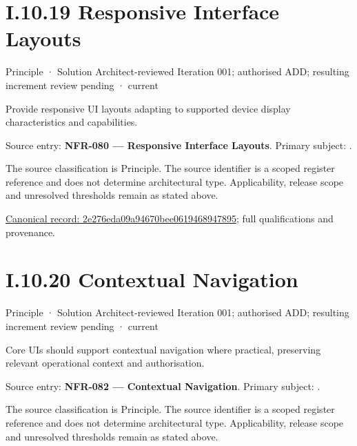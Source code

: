 \section*{I.10.19 Responsive Interface Layouts}
\label{navigation:I.10.19}

\label{element:2e276eda09a94670bee0619468947895}
{\small Principle · Solution Architect-reviewed Iteration 001; authorised ADD; resulting increment review pending · current}\par

Provide responsive UI layouts adapting to supported device display characteristics and capabilities.



Source entry: \textbf{NFR-080 — Responsive Interface Layouts}. Primary subject: \texttt{}.



The source classification is Principle. The source identifier is a scoped register reference and does not determine architectural type. Applicability, release scope and unresolved thresholds remain as stated above.


{\footnotesize \href{../../../../../../../continuum/motivation/principle/2e276eda09a94670bee0619468947895.md}{Canonical record: 2e276eda09a94670bee0619468947895}; full qualifications and provenance.}\par
\section*{I.10.20 Contextual Navigation}
\label{navigation:I.10.20}

\label{element:39d698ff446d48ab9358844666fcafe5}
{\small Principle · Solution Architect-reviewed Iteration 001; authorised ADD; resulting increment review pending · current}\par

Core UIs should support contextual navigation where practical, preserving relevant operational context and authorisation.



Source entry: \textbf{NFR-082 — Contextual Navigation}. Primary subject: \texttt{}.



The source classification is Principle. The source identifier is a scoped register reference and does not determine architectural type. Applicability, release scope and unresolved thresholds remain as stated above.



